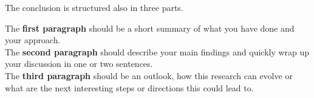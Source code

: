 The conclusion is structured also in three parts.

The \textbf{first paragraph} should be a short summary of what you have done and your approach. \\

The \textbf{second paragraph} should describe your main findings and quickly wrap up your discussion in one or two sentences. \\

The \textbf{third paragraph} should be an outlook, how this research can evolve or what are the next interesting steps or directions this could lead to. 
